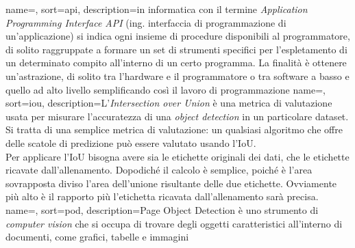 {
    name=,
    sort=api,
    description={in informatica con il termine \emph{Application Programming Interface API} (ing. interfaccia di programmazione di un'applicazione) si indica ogni insieme di procedure disponibili al programmatore, di solito raggruppate a formare un set di strumenti specifici per l'espletamento di un determinato compito all'interno di un certo programma. La finalità è ottenere un'astrazione, di solito tra l'hardware e il programmatore o tra software a basso e quello ad alto livello semplificando così il lavoro di programmazione}
}
{
    name=,
    sort=iou,
    description={L'\textit{Intersection over Union} è una metrica di valutazione usata per misurare l'accuratezza di una \textit{object detection} in un particolare dataset. Si tratta di una semplice metrica di valutazione: un qualsiasi algoritmo che offre delle scatole di predizione può essere valutato usando l'IoU. \\Per applicare l'IoU bisogna avere sia le etichette originali dei dati, che le etichette ricavate dall'allenamento. Dopodiché il calcolo è semplice, poiché è l'area sovrapposta diviso l'area dell'unione risultante delle due etichette. Ovviamente più alto è il rapporto più l'etichetta ricavata dall'allenamento sarà precisa.}
}
{
    name=,
    sort=pod,
    description={Page Object Detection è uno strumento di \textit{computer vision} che si occupa di trovare degli oggetti caratteristici all'interno di documenti, come grafici, tabelle e immagini} 
}

